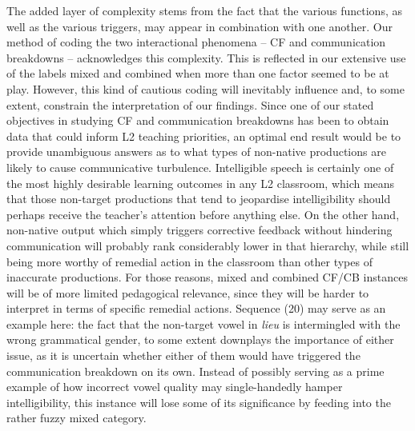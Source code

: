 \documentclass[12pt]{article}
\newenvironment{styleStandard}{\setlength\leftskip{0cm}\setlength\rightskip{0cm plus 1fil}\setlength\parindent{0cm}\setlength\parfillskip{0pt plus 1fil}\setlength\parskip{0cm plus 1pt}\writerlistparindent\writerlistleftskip\leavevmode\normalfont\normalsize\writerlistlabel\ignorespaces}{\unskip\vspace{0cm plus 1pt}\par}
\newcommand\writerlistleftskip{}
\newcommand\writerlistparindent{}
\newcommand\writerlistlabel{}
\begin{document}
\begin{styleStandard}
The added layer of complexity stems from the fact that the various functions, as well as the various triggers, may appear in combination with one another. Our method of coding the two interactional phenomena – CF and communication breakdowns – acknowledges this complexity. This is reflected in our extensive use of the labels mixed\textit{ }and combined when more than one factor seemed to be at play. However, this kind of cautious coding will inevitably influence and, to some extent, constrain the interpretation of our findings. Since one of our stated objectives in studying CF and communication breakdowns has been to obtain data that could inform L2 teaching priorities, an optimal end result would be to provide unambiguous answers as to what types of non-native productions are likely to cause communicative turbulence. Intelligible speech is certainly one of the most highly desirable learning outcomes in any L2 classroom, which means that those non-target productions that tend to jeopardise intelligibility should perhaps receive the teacher’s attention before anything else. On the other hand, non-native output which simply triggers corrective feedback without hindering communication will probably rank considerably lower in that hierarchy, while still being more worthy of remedial action in the classroom than other types of inaccurate productions. For those reasons, mixed and combined CF/CB instances will be of more limited pedagogical relevance, since they will be harder to interpret in terms of specific remedial actions. Sequence (20) may serve as an example here: the fact that the non-target vowel in \textit{lieu }is intermingled with the wrong grammatical gender, to some extent downplays the importance of either issue, as it is uncertain whether either of them would have triggered the communication breakdown on its own. Instead of possibly serving as a prime example of how incorrect vowel quality may single-handedly hamper intelligibility, this instance will lose some of its significance by feeding into the rather fuzzy mixed category.
\end{styleStandard}
\end{document}
